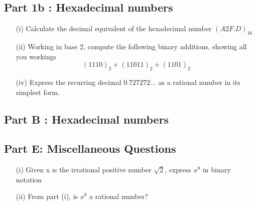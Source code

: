 \documentclass[]{report}
\begin{document}
\begin{enumerate}
\begin{itemize}
\end{itemize}

\subsection*{Part 1b : Hexadecimal numbers}
\begin{itemize}
\item[(i)] Calculate the decimal equivalent of the hexadecimal number $(A2F.D)_{16}$
\item[(ii)] Working in base 2, compute the following binary additions, showing all you workings
\[(1110)_2 + (11011)_2 + (1101)_2 \]
\item[(iv)] Express the recurring decimal $0.727272\ldots$ as a rational number in its simplest form.
\end{itemize}
\subsection*{Part B :  Hexadecimal numbers}



\subsection*{Part E: Miscellaneous Questions}
\begin{itemize}
\item[(i)] Given x is the irrational positive number $\sqrt{2}$, express $x^8$ in binary notation\\
\item[(ii)] From part (i), is $x^8$ a rational number?
\end{itemize}
\newpage


\end{enumerate}
\end{document}
